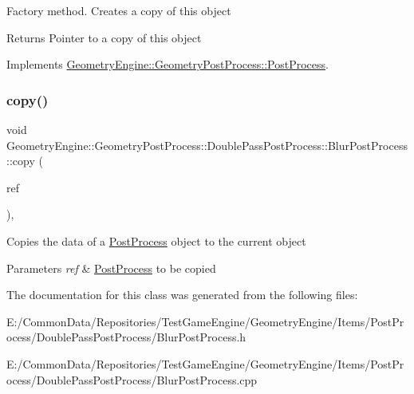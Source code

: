 Factory method. Creates a copy of this object \begin{DoxyReturn}{Returns}
Pointer to a copy of this object 
\end{DoxyReturn}


Implements \mbox{\hyperlink{class_geometry_engine_1_1_geometry_post_process_1_1_post_process_aa80749cf09041335f6b3bda3aaf31711}{Geometry\+Engine\+::\+Geometry\+Post\+Process\+::\+Post\+Process}}.

\mbox{\label{class_geometry_engine_1_1_geometry_post_process_1_1_double_pass_post_process_1_1_blur_post_process_ab3239347164b5c0bbe1b603f4d085181}} 
\subsubsection{\texorpdfstring{copy()}{copy()}}
{\footnotesize\ttfamily void Geometry\+Engine\+::\+Geometry\+Post\+Process\+::\+Double\+Pass\+Post\+Process\+::\+Blur\+Post\+Process\+::copy (\begin{DoxyParamCaption}\item[{const \mbox{\hyperlink{class_geometry_engine_1_1_geometry_post_process_1_1_double_pass_post_process_1_1_blur_post_process}{Blur\+Post\+Process}} \&}]{ref }\end{DoxyParamCaption})\hspace{0.3cm}{\ttfamily [protected]}, {\ttfamily [virtual]}}

Copies the data of a \mbox{\hyperlink{class_geometry_engine_1_1_geometry_post_process_1_1_post_process}{Post\+Process}} object to the current object 
\begin{DoxyParams}{Parameters}
{\em ref} & \mbox{\hyperlink{class_geometry_engine_1_1_geometry_post_process_1_1_post_process}{Post\+Process}} to be copied \\
\hline
\end{DoxyParams}


The documentation for this class was generated from the following files\+:\begin{DoxyCompactItemize}
\item 
E\+:/\+Common\+Data/\+Repositories/\+Test\+Game\+Engine/\+Geometry\+Engine/\+Items/\+Post\+Process/\+Double\+Pass\+Post\+Process/Blur\+Post\+Process.\+h\item 
E\+:/\+Common\+Data/\+Repositories/\+Test\+Game\+Engine/\+Geometry\+Engine/\+Items/\+Post\+Process/\+Double\+Pass\+Post\+Process/Blur\+Post\+Process.\+cpp\end{DoxyCompactItemize}
